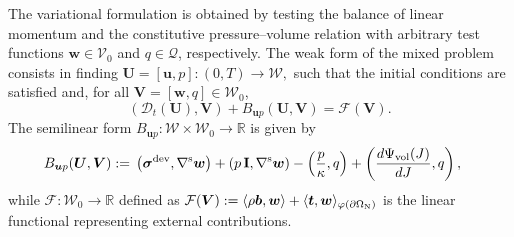 \documentclass[11pt,english]{article}
\def\disp{\boldsymbol{u}}
\def\disptest{\boldsymbol{w}}
\def\stress{\boldsymbol{\sigma}}
\def\Identity{\mathbf{I}}
\def\SpaceDisp{\boldsymbol{\mathcal{V}}}
\def\SpacePress{\mathcal{Q}}
\def\SpaceTotal{\boldsymbol{\mathcal{W}}}
\def\TestFunctions{\boldsymbol{V}}
\def\UnkVariables{\boldsymbol{U}}
\def\VolPsi{\Psi_{\rm{vol}}}
\def\t{\boldsymbol{t}}
\def\Bmixed{B_{\disp p}}
\begin{document}
    The variational formulation is obtained by testing the balance of linear momentum and the constitutive pressure--volume relation with arbitrary test functions
    $\disptest \in \SpaceDisp_0$ and $q \in \SpacePress$, respectively.
    The weak form of the mixed problem consists in finding $
    \UnkVariables = [\disp,p] : (0,T) \longrightarrow \SpaceTotal, $
    such that the initial conditions are satisfied and, for all
    $\TestFunctions = [\disptest,q] \in \SpaceTotal_0$,
    \begin{equation}
    \left(\mathcal{D}_t(\UnkVariables), \TestFunctions \right)
    + \Bmixed(\UnkVariables,\TestFunctions)
    = \mathcal{F}(\TestFunctions).
    \label{eq:variational_in_compact_form_mixed}
    \end{equation}
    The semilinear form $\Bmixed : \SpaceTotal \times \SpaceTotal_0 \rightarrow \mathbb{R}$ is given by
    \begin{align}
    \Bmixed(\UnkVariables,\TestFunctions)
    :=\;
    &\left( \stress^{\mathrm{dev}}, \nabla^{\mathrm{s}} \disptest \right)
    + \left( p\,\Identity, \nabla^{\mathrm{s}} \disptest \right)
    - \left( \dfrac{p}{\kappa}, q \right)
    + \left( \dfrac{d\VolPsi(J)}{dJ}, q \right),
    \label{eq:bilinear_form_mixed}
    \end{align}
    while $\mathcal{F} : \SpaceTotal_0 \rightarrow \mathbb{R}$ defined as $\mathcal{F}(\TestFunctions) := \langle \rho \boldsymbol{b}, \disptest \rangle + \langle \t, \disptest \rangle_{\varphi(\partial\Omega_{\rm N})}$ is the linear functional representing external contributions.




            
\end{document}
